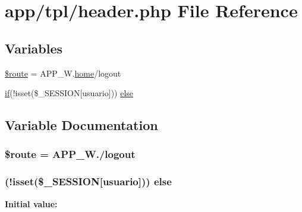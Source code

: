 \hypertarget{header_8php}{}\section{app/tpl/header.php File Reference}
\label{header_8php}
\subsection*{Variables}
\begin{DoxyCompactItemize}
\item 
\hyperlink{header_8php_af4105acdee5d34dc96c2aec4058b81f9}{\$route} = A\+P\+P\+\_\+\+W.\textquotesingle{}\hyperlink{classhome}{home}/logout\textquotesingle{}
\item 
\hyperlink{gmaps_8js_ab8cee96678df0427e480990f87d4b038}{if}(!isset(\$\+\_\+\+S\+E\+S\+S\+I\+O\+N\mbox{[}\textquotesingle{}usuario\textquotesingle{}\mbox{]})) \hyperlink{header_8php_aebb324e31947e1b1ce61f6f8624ce42c}{else}
\end{DoxyCompactItemize}


\subsection{Variable Documentation}
\hypertarget{header_8php_af4105acdee5d34dc96c2aec4058b81f9}{}
\subsubsection[{\$route}]{\setlength{\rightskip}{0pt plus 5cm}\$route = A\+P\+P\+\_\+\+W./logout\textquotesingle{}}\label{header_8php_af4105acdee5d34dc96c2aec4058b81f9}
\hypertarget{header_8php_aebb324e31947e1b1ce61f6f8624ce42c}{}
\subsubsection[{else}]{ (!isset(\$\+\_\+\+S\+E\+S\+S\+I\+O\+N\mbox{[}\textquotesingle{}usuario\textquotesingle{}\mbox{]})) else}\label{header_8php_aebb324e31947e1b1ce61f6f8624ce42c}
{\bfseries Initial value\+:}
